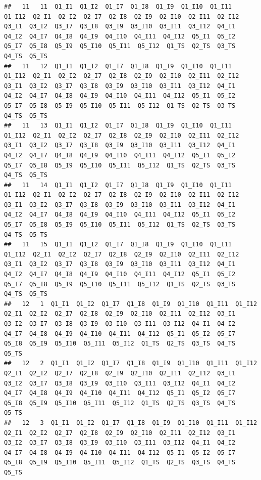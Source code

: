 \documentclass[]{book}
\begin{document}
\begin{verbatim}
##   11   11  Q1_I1  Q1_I2  Q1_I7  Q1_I8  Q1_I9  Q1_I10  Q1_I11  Q1_I12  Q2_I1  Q2_I2  Q2_I7  Q2_I8  Q2_I9  Q2_I10  Q2_I11  Q2_I12  Q3_I1  Q3_I2  Q3_I7  Q3_I8  Q3_I9  Q3_I10  Q3_I11  Q3_I12  Q4_I1  Q4_I2  Q4_I7  Q4_I8  Q4_I9  Q4_I10  Q4_I11  Q4_I12  Q5_I1  Q5_I2  Q5_I7  Q5_I8  Q5_I9  Q5_I10  Q5_I11  Q5_I12  Q1_TS  Q2_TS  Q3_TS  Q4_TS  Q5_TS
##   11   12  Q1_I1  Q1_I2  Q1_I7  Q1_I8  Q1_I9  Q1_I10  Q1_I11  Q1_I12  Q2_I1  Q2_I2  Q2_I7  Q2_I8  Q2_I9  Q2_I10  Q2_I11  Q2_I12  Q3_I1  Q3_I2  Q3_I7  Q3_I8  Q3_I9  Q3_I10  Q3_I11  Q3_I12  Q4_I1  Q4_I2  Q4_I7  Q4_I8  Q4_I9  Q4_I10  Q4_I11  Q4_I12  Q5_I1  Q5_I2  Q5_I7  Q5_I8  Q5_I9  Q5_I10  Q5_I11  Q5_I12  Q1_TS  Q2_TS  Q3_TS  Q4_TS  Q5_TS
##   11   13  Q1_I1  Q1_I2  Q1_I7  Q1_I8  Q1_I9  Q1_I10  Q1_I11  Q1_I12  Q2_I1  Q2_I2  Q2_I7  Q2_I8  Q2_I9  Q2_I10  Q2_I11  Q2_I12  Q3_I1  Q3_I2  Q3_I7  Q3_I8  Q3_I9  Q3_I10  Q3_I11  Q3_I12  Q4_I1  Q4_I2  Q4_I7  Q4_I8  Q4_I9  Q4_I10  Q4_I11  Q4_I12  Q5_I1  Q5_I2  Q5_I7  Q5_I8  Q5_I9  Q5_I10  Q5_I11  Q5_I12  Q1_TS  Q2_TS  Q3_TS  Q4_TS  Q5_TS
##   11   14  Q1_I1  Q1_I2  Q1_I7  Q1_I8  Q1_I9  Q1_I10  Q1_I11  Q1_I12  Q2_I1  Q2_I2  Q2_I7  Q2_I8  Q2_I9  Q2_I10  Q2_I11  Q2_I12  Q3_I1  Q3_I2  Q3_I7  Q3_I8  Q3_I9  Q3_I10  Q3_I11  Q3_I12  Q4_I1  Q4_I2  Q4_I7  Q4_I8  Q4_I9  Q4_I10  Q4_I11  Q4_I12  Q5_I1  Q5_I2  Q5_I7  Q5_I8  Q5_I9  Q5_I10  Q5_I11  Q5_I12  Q1_TS  Q2_TS  Q3_TS  Q4_TS  Q5_TS
##   11   15  Q1_I1  Q1_I2  Q1_I7  Q1_I8  Q1_I9  Q1_I10  Q1_I11  Q1_I12  Q2_I1  Q2_I2  Q2_I7  Q2_I8  Q2_I9  Q2_I10  Q2_I11  Q2_I12  Q3_I1  Q3_I2  Q3_I7  Q3_I8  Q3_I9  Q3_I10  Q3_I11  Q3_I12  Q4_I1  Q4_I2  Q4_I7  Q4_I8  Q4_I9  Q4_I10  Q4_I11  Q4_I12  Q5_I1  Q5_I2  Q5_I7  Q5_I8  Q5_I9  Q5_I10  Q5_I11  Q5_I12  Q1_TS  Q2_TS  Q3_TS  Q4_TS  Q5_TS
##   12   1  Q1_I1  Q1_I2  Q1_I7  Q1_I8  Q1_I9  Q1_I10  Q1_I11  Q1_I12  Q2_I1  Q2_I2  Q2_I7  Q2_I8  Q2_I9  Q2_I10  Q2_I11  Q2_I12  Q3_I1  Q3_I2  Q3_I7  Q3_I8  Q3_I9  Q3_I10  Q3_I11  Q3_I12  Q4_I1  Q4_I2  Q4_I7  Q4_I8  Q4_I9  Q4_I10  Q4_I11  Q4_I12  Q5_I1  Q5_I2  Q5_I7  Q5_I8  Q5_I9  Q5_I10  Q5_I11  Q5_I12  Q1_TS  Q2_TS  Q3_TS  Q4_TS  Q5_TS
##   12   2  Q1_I1  Q1_I2  Q1_I7  Q1_I8  Q1_I9  Q1_I10  Q1_I11  Q1_I12  Q2_I1  Q2_I2  Q2_I7  Q2_I8  Q2_I9  Q2_I10  Q2_I11  Q2_I12  Q3_I1  Q3_I2  Q3_I7  Q3_I8  Q3_I9  Q3_I10  Q3_I11  Q3_I12  Q4_I1  Q4_I2  Q4_I7  Q4_I8  Q4_I9  Q4_I10  Q4_I11  Q4_I12  Q5_I1  Q5_I2  Q5_I7  Q5_I8  Q5_I9  Q5_I10  Q5_I11  Q5_I12  Q1_TS  Q2_TS  Q3_TS  Q4_TS  Q5_TS
##   12   3  Q1_I1  Q1_I2  Q1_I7  Q1_I8  Q1_I9  Q1_I10  Q1_I11  Q1_I12  Q2_I1  Q2_I2  Q2_I7  Q2_I8  Q2_I9  Q2_I10  Q2_I11  Q2_I12  Q3_I1  Q3_I2  Q3_I7  Q3_I8  Q3_I9  Q3_I10  Q3_I11  Q3_I12  Q4_I1  Q4_I2  Q4_I7  Q4_I8  Q4_I9  Q4_I10  Q4_I11  Q4_I12  Q5_I1  Q5_I2  Q5_I7  Q5_I8  Q5_I9  Q5_I10  Q5_I11  Q5_I12  Q1_TS  Q2_TS  Q3_TS  Q4_TS  Q5_TS

\end{verbatim}
\end{document}
